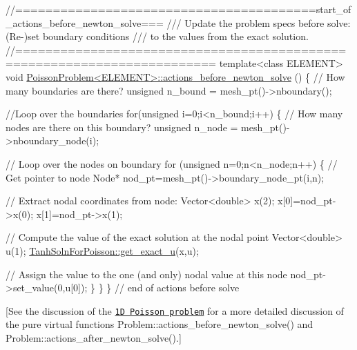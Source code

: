 \begin{DoxyCodeInclude}
\textcolor{comment}{//========================================start\_of\_actions\_before\_newton\_solve===}
\textcolor{comment}{/// Update the problem specs before solve: (Re-)set boundary conditions}
\textcolor{comment}{}\textcolor{comment}{/// to the values from the exact solution.}
\textcolor{comment}{}\textcolor{comment}{//========================================================================}
\textcolor{keyword}{template}<\textcolor{keyword}{class} ELEMENT>
\textcolor{keywordtype}{void} \hyperlink{classPoissonProblem_a398608a5ff73b74c5a387b3f794c58df}{PoissonProblem<ELEMENT>::actions\_before\_newton\_solve}
      ()
\{
 \textcolor{comment}{// How many boundaries are there?}
 \textcolor{keywordtype}{unsigned} n\_bound = mesh\_pt()->nboundary();
 
 \textcolor{comment}{//Loop over the boundaries}
 \textcolor{keywordflow}{for}(\textcolor{keywordtype}{unsigned} i=0;i<n\_bound;i++)
  \{
   \textcolor{comment}{// How many nodes are there on this boundary?}
   \textcolor{keywordtype}{unsigned} n\_node = mesh\_pt()->nboundary\_node(i);

   \textcolor{comment}{// Loop over the nodes on boundary}
   \textcolor{keywordflow}{for} (\textcolor{keywordtype}{unsigned} n=0;n<n\_node;n++)
    \{
     \textcolor{comment}{// Get pointer to node}
     Node* nod\_pt=mesh\_pt()->boundary\_node\_pt(i,n);

     \textcolor{comment}{// Extract nodal coordinates from node:}
     Vector<double> x(2);
     x[0]=nod\_pt->x(0);
     x[1]=nod\_pt->x(1);

     \textcolor{comment}{// Compute the value of the exact solution at the nodal point}
     Vector<double> u(1);
     \hyperlink{namespaceTanhSolnForPoisson_af7896e9c18ce6438c73ae2a875e8b7de}{TanhSolnForPoisson::get\_exact\_u}(x,u);

     \textcolor{comment}{// Assign the value to the one (and only) nodal value at this node}
     nod\_pt->set\_value(0,u[0]);
    \}
  \} 
\}  \textcolor{comment}{// end of actions before solve}

\end{DoxyCodeInclude}


\mbox{[}See the discussion of the \href{../../../poisson//one_d_poisson/html/index.html}{\tt 1D Poisson problem} for a more detailed discussion of the pure virtual functions {\ttfamily Problem\+::actions\+\_\+before\+\_\+newton\+\_\+solve()} and {\ttfamily Problem\+::actions\+\_\+after\+\_\+newton\+\_\+solve()}.\mbox{]}



